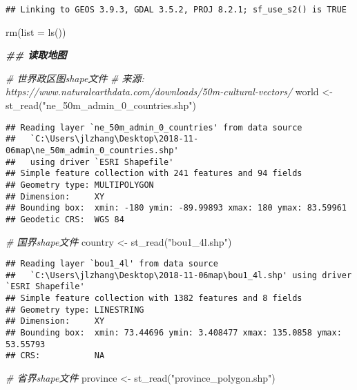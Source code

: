 \documentclass[
]{article}
\newenvironment{Shaded}{\begin{snugshade}}{\end{snugshade}}
\newcommand{\AttributeTok}[1]{\textcolor[rgb]{0.77,0.63,0.00}{#1}}
\newcommand{\CommentTok}[1]{\textcolor[rgb]{0.56,0.35,0.01}{\textit{#1}}}
\newcommand{\DocumentationTok}[1]{\textcolor[rgb]{0.56,0.35,0.01}{\textbf{\textit{#1}}}}
\newcommand{\FunctionTok}[1]{\textcolor[rgb]{0.00,0.00,0.00}{#1}}
\newcommand{\NormalTok}[1]{#1}
\newcommand{\OtherTok}[1]{\textcolor[rgb]{0.56,0.35,0.01}{#1}}
\newcommand{\StringTok}[1]{\textcolor[rgb]{0.31,0.60,0.02}{#1}}
\begin{document}
\begin{verbatim}
## Linking to GEOS 3.9.3, GDAL 3.5.2, PROJ 8.2.1; sf_use_s2() is TRUE
\end{verbatim}

\begin{Shaded}
\begin{Highlighting}[]
\FunctionTok{rm}\NormalTok{(}\AttributeTok{list =} \FunctionTok{ls}\NormalTok{())}

\DocumentationTok{\#\# 读取地图}

\CommentTok{\# 世界政区图shape文件}
\CommentTok{\# 来源: https://www.naturalearthdata.com/downloads/50m{-}cultural{-}vectors/}
\NormalTok{world }\OtherTok{\textless{}{-}} \FunctionTok{st\_read}\NormalTok{(}\StringTok{"ne\_50m\_admin\_0\_countries.shp"}\NormalTok{)}
\end{Highlighting}
\end{Shaded}

\begin{verbatim}
## Reading layer `ne_50m_admin_0_countries' from data source 
##   `C:\Users\jlzhang\Desktop\2018-11-06map\ne_50m_admin_0_countries.shp' 
##   using driver `ESRI Shapefile'
## Simple feature collection with 241 features and 94 fields
## Geometry type: MULTIPOLYGON
## Dimension:     XY
## Bounding box:  xmin: -180 ymin: -89.99893 xmax: 180 ymax: 83.59961
## Geodetic CRS:  WGS 84
\end{verbatim}

\begin{Shaded}
\begin{Highlighting}[]
\CommentTok{\# 国界shape文件}
\NormalTok{country }\OtherTok{\textless{}{-}} \FunctionTok{st\_read}\NormalTok{(}\StringTok{"bou1\_4l.shp"}\NormalTok{)}
\end{Highlighting}
\end{Shaded}

\begin{verbatim}
## Reading layer `bou1_4l' from data source 
##   `C:\Users\jlzhang\Desktop\2018-11-06map\bou1_4l.shp' using driver `ESRI Shapefile'
## Simple feature collection with 1382 features and 8 fields
## Geometry type: LINESTRING
## Dimension:     XY
## Bounding box:  xmin: 73.44696 ymin: 3.408477 xmax: 135.0858 ymax: 53.55793
## CRS:           NA
\end{verbatim}

\begin{Shaded}
\begin{Highlighting}[]
\CommentTok{\# 省界shape文件}
\NormalTok{province }\OtherTok{\textless{}{-}} \FunctionTok{st\_read}\NormalTok{(}\StringTok{"province\_polygon.shp"}\NormalTok{)}
\end{Highlighting}
\end{Shaded}
\end{document}
